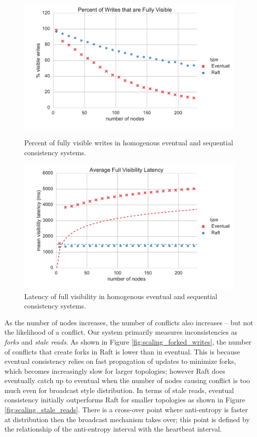 \documentclass{article}
\begin{document}
\begin{figure}
    \centering
      \includegraphics[width=\linewidth]{figures/scaling/visible_writes}
      \caption{Percent of fully visible writes in homogenous eventual and sequential consistency systems.}
      \label{fig:scaling_visible_writes}
    \endminipage\hfill
      \includegraphics[width=\linewidth]{figures/scaling/visibility_latency}
      \caption{Latency of full visibility in homogenous eventual and sequential consistency systems.}
      \label{fig:scaling_visibility_latency}
    \endminipage
\end{figure}

As the number of nodes increases, the number of conflicts also increases -- but not the likelihood of a conflict. Our system primarily measures inconsistencies as \textit{forks} and \textit{stale reads}. As shown in Figure \ref{fig:scaling_forked_writes}, the number of conflicts that create forks in Raft is lower than in eventual. This is because eventual consistency relies on fast propagation of updates to minimize forks, which becomes increasingly slow for larger topologies; however Raft does eventually catch up to eventual when the number of nodes causing conflict is too much even for broadcast style distribution. In terms of stale reads, eventual consistency initially outperforms Raft for smaller topologies as shown in Figure \ref{fig:scaling_stale_reads}. There is a cross-over point where anti-entropy is faster at distribution then the broadcast mechanism takes over; this point is defined by the relationship of the anti-entropy interval with the heartbeat interval.
\end{document}
